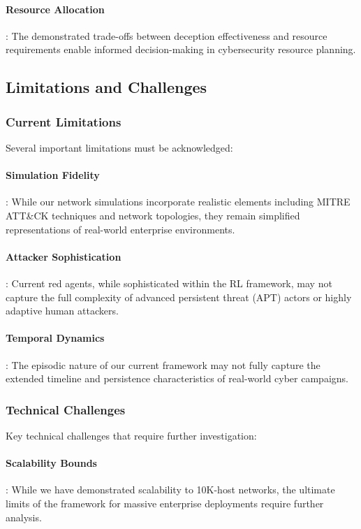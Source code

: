 \documentclass[12pt,oneside]{article}
\begin{document}
\paragraph{Resource Allocation}: The demonstrated trade-offs between deception effectiveness and resource requirements enable informed decision-making in cybersecurity resource planning.

\subsection{Limitations and Challenges}

\subsubsection{Current Limitations}
Several important limitations must be acknowledged:

\paragraph{Simulation Fidelity}: While our network simulations incorporate realistic elements including MITRE ATT\&CK techniques and network topologies, they remain simplified representations of real-world enterprise environments.

\paragraph{Attacker Sophistication}: Current red agents, while sophisticated within the RL framework, may not capture the full complexity of advanced persistent threat (APT) actors or highly adaptive human attackers.

\paragraph{Temporal Dynamics}: The episodic nature of our current framework may not fully capture the extended timeline and persistence characteristics of real-world cyber campaigns.

\subsubsection{Technical Challenges}
Key technical challenges that require further investigation:

\paragraph{Scalability Bounds}: While we have demonstrated scalability to 10K-host networks, the ultimate limits of the framework for massive enterprise deployments require further analysis.
\end{document}
